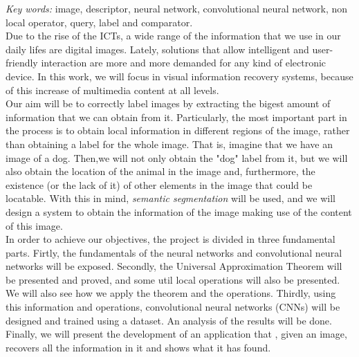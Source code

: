 \emph{Key words:} image, descriptor, neural network, convolutional neural network, non local operator, query, label and comparator.\\

Due to the rise of the ICTs, a wide range of the information that we use in our daily lifes are digital images. Lately, solutions that allow intelligent and user-friendly interaction are more and more demanded for any kind of electronic device. In this work, we will focus in visual information recovery systems, because of this increase of multimedia content at all levels.\\

Our aim will be to correctly label images by extracting the bigest amount of information that we can obtain from it. Particularly, the most important part in the process is to obtain local information in different regions of the image, rather than obtaining a label for the whole image. That is, imagine that we have an image of a dog. Then,we will not only obtain the "dog" label from it, but we will also obtain the location of the animal in the image and, furthermore, the existence (or the lack of it) of other elements in the image that could be locatable. With this in mind, \emph{semantic segmentation} will be used, and we will design a system to obtain the information of the image making use of the content of this image. \\

In order to achieve our objectives, the project is divided in three fundamental parts. Firtly, the fundamentals of the neural networks and convolutional neural networks will be exposed. Secondly, the Universal Approximation Theorem will be presented and proved, and some util local operations will also be presented. We will also see how we apply the theorem and the operations. Thirdly, using this information and operations, convolutional neural networks (CNNs) will be designed and trained using a dataset. An analysis of the results will be done. Finally, we will present the development of an application that , given an image, recovers all the information in it and shows what it has found.

\endinput

